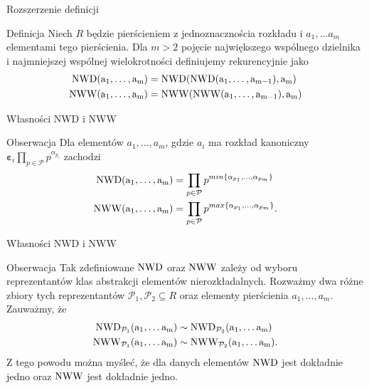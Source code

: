 \documentclass{beamer}
\newcommand{\NWD}{\rm{NWD}}
\newcommand{\NWW}{\rm{NWW}}
\renewcommand{\epsilon}{\bm{\varepsilon}}
\begin{document}
\begin{frame}{Rozszerzenie definicji}
    \begin{block}{Definicja}
        Niech $R$ będzie pierścieniem z jednoznacznościa rozkładu i $a_1, \ldots a_m$ elementami tego pierścienia.
        Dla $m >2$ pojęcie największego wspólnego dzielnika i najmniejszej wspólnej wielokrotności definiujemy rekurencyjnie jako
        \begin{align*}
            \NWD(a_1 , \ldots , a_m) & = \NWD(\NWD(a_1, \ldots , a_{m-1}), a_m) \\
            \NWW(a_1 , \ldots , a_m) & = \NWW(\NWW(a_1, \ldots , a_{m-1}), a_m)
        \end{align*}
    \end{block}
\end{frame}

\begin{frame}{Własności NWD i NWW}
    \begin{alertblock}{Obserwacja}
        Dla elementów $a_1, \ldots, a_m$, gdzie $a_i$ ma rozkład kanoniczny $\epsilon_i \prod_{p \in \mathcal{P}} p^{\alpha_{p_{i}}}$ zachodzi 
        \begin{align*}
            \NWD(a_1 , \ldots , a_m) & = \prod_{p \in \mathcal{P}} p^{min\{\alpha_{p_1}, \ldots , \alpha_{p_{m}}\}}\\
            \NWW(a_1 , \ldots , a_m) & = \prod_{p \in \mathcal{P}} p^{max\{\alpha_{p_1}, \ldots , \alpha_{p_{m}}\}}.
        \end{align*}
    \end{alertblock}
\end{frame}

\begin{frame}{Własności NWD i NWW}
    \begin{alertblock}{Obserwacja}
        Tak zdefiniowane $\NWD$ oraz $\NWW$ zależy od wyboru reprezentantów klas abstrakcji elementów nierozkładalnych.
        Rozważmy dwa różne zbiory tych reprezentantów  $\mathcal{P}_1 , \mathcal{P}_2 \subseteq R$ oraz elementy pierścienia $a_1, \ldots, a_m$. 
        Zauważmy, że 
        \begin{align*}
            \NWD_{\mathcal{P}_1} (a_1 , \ldots a_m) & \sim  \NWD_{\mathcal{P}_2} (a_1 , \ldots a_m) \\ 
            \NWW_{\mathcal{P}_1} (a_1 , \ldots a_m) & \sim \NWW_{\mathcal{P}_2} (a_1 , \ldots a_m).
        \end{align*}
        Z tego powodu można myśleć, że dla danych elementów $\NWD$ jest dokładnie jedno oraz $\NWW$ jest dokładnie jedno.
    \end{alertblock}
\end{frame}
\end{document}
